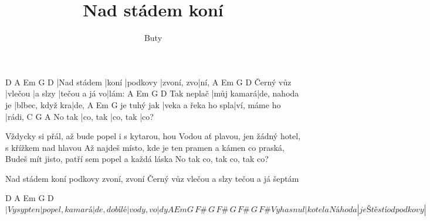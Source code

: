 \documentclass[columns]{song}
\title{Nad stádem koní}
\author{Buty}
\begin{document}
\strophe
D           A     Em       G          D
|Nad stádem |koní |podkovy |zvoní, zvo|ní,
          A       Em      G             D
Černý vůz |vlečou |a slzy |tečou a já vo|lám:
           A          Em             G               D
Tak neplač |můj kamará|de, nahoda je |blbec, když kra|de,
            A                   Em           G
je tuhý jak |veka a řeka ho spla|ví, máme ho |rádi,
       C        G        A
No tak |co, tak |co, tak |co?
\endstrophe

\strophe*
Vždycky si přál, až bude popel i s kytarou, hou
Vodou ať plavou, jen žádný hotel, s křížkem nad hlavou
Až najdeš místo, kde je ten pramen a kámen co praská,
Budeš mít jisto, patří sem popel a každá láska
No tak co, tak co, tak co?
\endstrophe

\strophe*
Nad stádem koní podkovy zvoní, zvoní
Černý vůz vlečou a slzy tečou a já šeptám
\endstrophe

\strophe
   D          A             Em           G        D
\[ |Vysyp ten |popel, kamará|de, do bílé |vody, vo|dy
         A               Em                   G\,F\#\,G\,F\#\,G\,F\#\,G\,F\#
Vyhasnul |kotel a Náhoda |je Štěstí od podkovy| \]
\endstrophe
\end{document}
